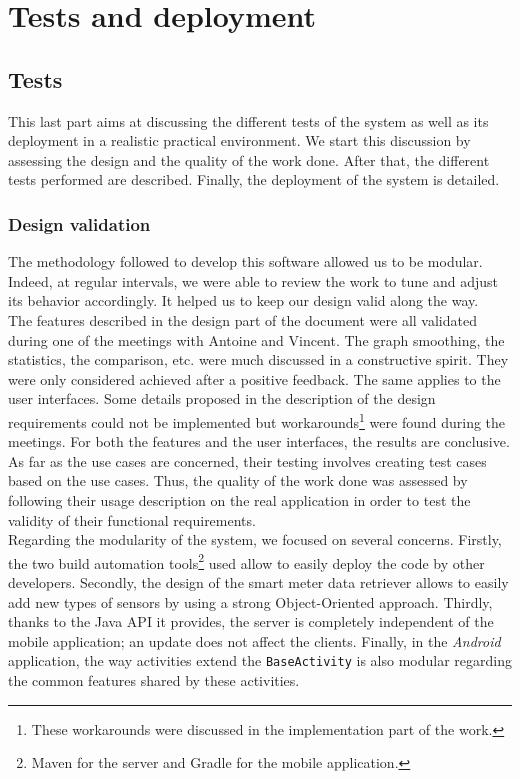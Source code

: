 \documentclass[a4paper, oneside, 11pt]{book}
\newcommand\partcontent{}
\begin{document}
\part{Tests and deployment}
\renewcommand\partcontent{TESTS AND DEPLOYMENT: }

\chapter{Tests}
This last part aims at discussing the different tests of the system as well as its deployment in a realistic practical environment. We start this discussion by assessing the design and the quality of the work done. After that, the different tests performed are described. Finally, the deployment of the system is detailed.

\section{Design validation}
The methodology followed to develop this software allowed us to be modular. Indeed, at regular intervals, we were able to review the work to tune and adjust its behavior accordingly. It helped us to keep our design valid along the way.\\

The features described in the design part of the document were all validated during one of the meetings with Antoine and Vincent. The graph smoothing, the statistics, the comparison, etc. were much discussed in a constructive spirit. They were only considered achieved after a positive feedback. The same applies to the user interfaces. Some details proposed in the description  of the design requirements could not be implemented but workarounds\footnote{These workarounds were discussed in the implementation part of the work.} were found during the meetings. For both the features and the user interfaces, the results are conclusive.\\
As far as the use cases are concerned, their testing involves creating test cases based on the use cases. Thus, the quality of the work done was assessed by following their usage description on the real application in order to test the validity of their functional requirements. \\ 

Regarding the modularity of the system, we focused on several concerns. Firstly, the two build automation tools\footnote{Maven for the server and Gradle for the mobile application.} used allow to easily deploy the code by other developers. Secondly, the design of the smart meter data retriever allows to easily add new types of sensors by using a strong Object-Oriented approach. Thirdly, thanks to the Java API it provides, the server is completely independent of the mobile application; an update does not affect the clients. Finally, in the \textit{Android} application, the way activities extend the \texttt{BaseActivity} is also modular regarding the common features shared by these activities.
\end{document}
